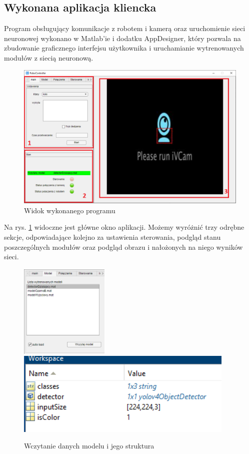 \subsection{Wykonana aplikacja kliencka}
Program obsługujący komunikacje z robotem i kamerą oraz uruchomienie sieci neuronowej wykonano w Matlab'ie i dodatku AppDesigner, 
który pozwala na zbudowanie graficznego interfejsu użytkownika i uruchamianie wytrenowanych modułów z siecią neuronową. 
\begin{figure}[H]
	\centering
	\includegraphics[width=12cm]{pages/siecIRobot/zdjecia/program/programCaly.png}
	\caption{Widok wykonanego programu}
	\label{fig:schematSterujacy}
\end{figure}
Na rys. \ref{fig:schematSterujacy} widoczne jest główne okno aplikacji. Możemy wyróżnić trzy odrębne sekcje,
odpowiadające kolejno za ustawienia sterowania, podgląd stanu poszczególnych modułów oraz podgląd obrazu i nałożonych na niego wyników sieci.
\begin{figure}[H]
	\centering
	\includegraphics[height=4.5cm]{pages/siecIRobot/zdjecia/program/programUstModel.png}
	\includegraphics[height=4cm]{pages/siecIRobot/zdjecia/program/daneModeluSieci.png}
	\caption{Wczytanie danych modelu i jego struktura}
\end{figure}
